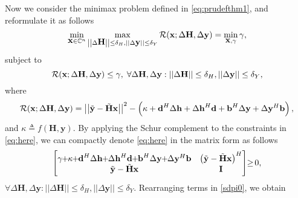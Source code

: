 \documentclass[review,sort&compress]{elsarticle}
\renewcommand{\vec}[1]{\mbox{$\mathbf{#1}$}}
\newcommand{\norm}[1]{\left|\left|#1\right|\right|}
\newcommand{\defi}{\triangleq}
\newcommand{\C}{\mathbb{C}}
\newcommand{\R}{{\cal R}}
\newcommand{\vH}{\vec{H}}
\newcommand{\vx}{\vec{x}}
\newcommand{\vy}{\vec{y}}
\newcommand{\dH}{\Delta\vH}
\newcommand{\dy}{\Delta\vy}
\newcommand{\tH}{\tilde{\vec{H}}}
\newcommand{\ty}{\tilde{\vec{y}}}
\newcommand{\vd}{\vec{d}}
\newcommand{\dvh}{\Delta\vec{h}}
\newcommand{\vI}{\vec{I}}
\newcommand{\vb}{\vec{b}}
\begin{document}
Now we consider the minimax problem defined in \eqref{eq:prudefthm1}, and reformulate it as follows
\[
  \min_{\vx \in \C^n} \max_{\norm{\dH} \leq \delta_H,\norm{\dy} \leq \delta_Y} \R(\vx; \dH,\dy) = \min_{\vx,\gamma} \gamma,
\]
subject to \begin{equation}\label{eq:here}
  \R(\vx; \dH,\dy) \leq \gamma, \; \forall \dH, \dy : \norm{\dH} \leq \delta_H, \norm{\dy} \leq \delta_Y,
\end{equation}
where
\begin{equation}
  \R(\vx; \dH,\dy) = {\norm{\ty - \tH \vx}}^2 - \left( \kappa + \vd^H \dvh + \dvh^H \vd + \vb^H \dy + \dy^H \vb \right),
\end{equation}
and $\kappa \defi f(\vH, \vy)$. By applying the Schur complement to the constraints in \eqref{eq:here}, we can compactly denote \eqref{eq:here} in the matrix form as follows
\begin{equation}\label{sdpi0}
  \begin{bmatrix}
  \gamma \hspace{-0.1cm} + \hspace{-0.1cm} \kappa \hspace{-0.1cm} + \hspace{-0.1cm} \vd^H \dvh \hspace{-0.1cm} + \hspace{-0.1cm} \dvh^H \vd \hspace{-0.1cm} + \hspace{-0.1cm} \vb^H \dy \hspace{-0.1cm} + \hspace{-0.1cm} \dy^H \vb & \left( \ty - \tH \vx \right)^H \\
  \ty - \tH \vx    & \vI
  \end{bmatrix}  \hspace{-0.1cm}
  \geq \hspace{-0.05cm} 0,
\end{equation}
$\forall \dH, \dy : \norm{\dH} \leq \delta_H, \norm{\dy} \leq \delta_Y$. Rearranging terms in \eqref{sdpi0}, we obtain
\end{document}
